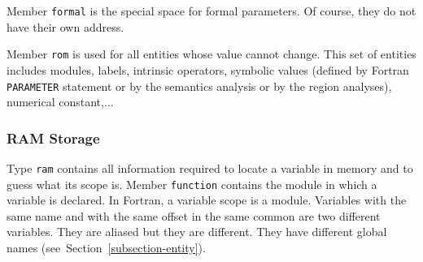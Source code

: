 \documentclass[a4paper]{article}
\begin{document}
\begin{comment}
Le sous-domaine \verb/ram/ est reserv� aux variables ayant une adresse
en m�moire. Il permet de pr�ciser dans quelle fonction et
�ventuellement dans quel common ces variables ont �t� d�clar�es.
\end{comment}

Member \texttt{formal} is the special space for formal parameters. Of
course, they do not have their own address.

\begin{comment}
Le sous-domaine \verb/formal/ est r�serv� aux param�tres formels des
modules.
\end{comment}

Member \texttt{rom} is used for all entities whose value cannot change. This
set of entities includes modules, labels, intrinsic operators, symbolic
values (defined by Fortran \texttt{PARAMETER} statement or by the semantics
analysis or by the region analyses), numerical constant,...

\begin{comment}
Le sous-domaine \verb/rom/ est utilis� pour toutes les entit�s dont la
valeur n'est pas modifiable, telles que les fonctions, les labels, les
op�rateurs, etc.
\end{comment}

\subsubsection{RAM Storage}
\label{subsubsection-ram}

{}

Type \texttt{ram} contains all information required to locate a variable in
memory and to guess what its scope is. Member \texttt{function} contains
the module in which a variable is declared. In Fortran, a variable scope
is a module. Variables with the same name and with the same offset in
the same common are two different variables. They are aliased but they
are different. They have different global names
(see~Section~\ref{subsection-entity}).
\end{document}
